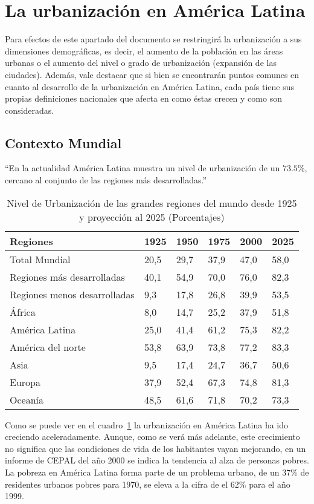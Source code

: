 \section{La urbanización en América Latina}

Para efectos de este apartado del documento se restringirá la urbanización a sus dimensiones
demográficas, es decir, el aumento de la población en las áreas urbanas o el aumento del nivel o
grado de urbanización (expansión de las ciudades). Además, vale destacar que si bien se encontrarán
puntos comunes en cuanto al desarrollo de la urbanización en América Latina, cada país tiene sus
propias definiciones nacionales que afecta en como éstas crecen y como son consideradas.

\subsection{Contexto Mundial}
``En la actualidad América Latina muestra un nivel de urbanización de un $73.5\%$, cercano al conjunto
de las regiones más desarrolladas\cite{Lattes}.''

\begin{table}
  \centering
  \caption{Nivel de Urbanización de las grandes regiones del mundo desde 1925 y proyección al 2025
  (Porcentajes)
  }
  \label{latammundo}
  \begin{tabular}{|llllll|}
    \hline
    \textbf{Regiones} & 1925 & 1950 & 1975 & 2000 & 2025 \\
    \hline
    Total Mundial &  20,5 &29,7 &37,9 &47,0 &58,0 \\
    \hline
    Regiones más desarrolladas &  40,1 &  54,9 &  70,0 &76,0 &82,3 \\
    Regiones menos desarrolladas &  9,3 &17,8 &26,8 &39,9 &53,5 \\
    \hline
    África &  8,0 &14,7 &25,2 &37,9 &51,8 \\
    América Latina &  25,0 &41,4 &61,2 &75,3 &82,2 \\
    América del norte &  53,8 &63,9 &73,8 &77,2 &83,3 \\
    Asia &  9,5 &17,4 &24,7 &36,7 &50,6 \\
    Europa &  37,9 &52,4 &67,3 &74,8 &81,3 \\
    Oceanía &  48,5 &61,6 &71,8 &70,2 &73,3 \\
    \hline
  \end{tabular}
\end{table}

Como se puede ver en el cuadro~\ref{latammundo} la urbanización en América Latina ha ido creciendo aceleradamente. Aunque, como se
verá más adelante, este crecimiento no significa que las condiciones de vida de los habitantes vayan
mejorando, en un informe de CEPAL del año 2000 se indica la tendencia al alza de personas pobres. La
pobreza en América Latina forma parte de un problema urbano, de un 37\% de residentes urbanos pobres
para 1970, se eleva a la cifra de el 62\% para el año 1999.

